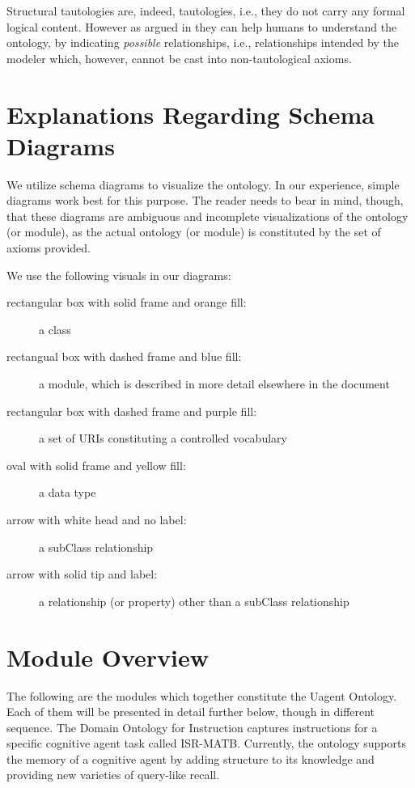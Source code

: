 Structural tautologies are, indeed, tautologies, i.e., they do not carry any formal logical content. However as argued in \cite{HitzlerK16} they can help humans to understand the ontology, by indicating \emph{possible} relationships, i.e., relationships intended by the modeler which, however, cannot be cast into non-tautological axioms.

\section*{Explanations Regarding Schema Diagrams}

We utilize schema diagrams to visualize the ontology. In our experience, simple diagrams work best for this purpose. The reader needs to bear in mind, though, that these diagrams are ambiguous and incomplete visualizations of the ontology (or module), as the actual ontology (or module) is constituted by the set of axioms provided. 

We use the following visuals in our diagrams:

\begin{description}
\item[rectangular box with solid frame and orange fill:] a class
\item[rectangual box with dashed frame and blue fill:] a module, which is described in more detail elsewhere in the document
\item[rectangular box with dashed frame and purple fill:] a set of URIs constituting a controlled vocabulary
\item[oval with solid frame and yellow fill:] a data type
\item[arrow with white head and no label:] a subClass relationship
\item[arrow with solid tip and label:] a relationship (or property) other than a subClass relationship
\end{description}



\section{Module Overview}
\label{ssec:modules}

The following are the modules which together constitute the Uagent Ontology. Each of them will be presented in detail further below, though in different sequence. The Domain Ontology for Instruction captures instructions for a specific cognitive agent task called ISR-MATB. Currently, the ontology supports the memory of a cognitive agent by adding structure to its knowledge and providing new varieties of query-like recall.

